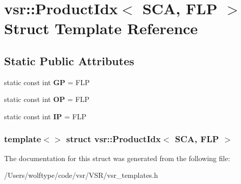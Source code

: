 \hypertarget{structvsr_1_1_product_idx_3_01_s_c_a_00_01_f_l_p_01_4}{\section{vsr\-:\-:Product\-Idx$<$ S\-C\-A, F\-L\-P $>$ Struct Template Reference}
\label{structvsr_1_1_product_idx_3_01_s_c_a_00_01_f_l_p_01_4}
}
\subsection*{Static Public Attributes}
\begin{DoxyCompactItemize}
\item 
\hypertarget{structvsr_1_1_product_idx_3_01_s_c_a_00_01_f_l_p_01_4_aa9c43460646c684ac5ad32e8f8d000f6}{static const int {\bfseries G\-P} = F\-L\-P}\label{structvsr_1_1_product_idx_3_01_s_c_a_00_01_f_l_p_01_4_aa9c43460646c684ac5ad32e8f8d000f6}

\item 
\hypertarget{structvsr_1_1_product_idx_3_01_s_c_a_00_01_f_l_p_01_4_a43f7615acd74e49afbeee18d6b19b89f}{static const int {\bfseries O\-P} = F\-L\-P}\label{structvsr_1_1_product_idx_3_01_s_c_a_00_01_f_l_p_01_4_a43f7615acd74e49afbeee18d6b19b89f}

\item 
\hypertarget{structvsr_1_1_product_idx_3_01_s_c_a_00_01_f_l_p_01_4_a0df1b884b42487070fb1b66b99a762ac}{static const int {\bfseries I\-P} = F\-L\-P}\label{structvsr_1_1_product_idx_3_01_s_c_a_00_01_f_l_p_01_4_a0df1b884b42487070fb1b66b99a762ac}

\end{DoxyCompactItemize}
\subsubsection*{template$<$$>$ struct vsr\-::\-Product\-Idx$<$ S\-C\-A, F\-L\-P $>$}



The documentation for this struct was generated from the following file\-:\begin{DoxyCompactItemize}
\item 
/\-Users/wolftype/code/vsr/\-V\-S\-R/vsr\-\_\-templates.\-h\end{DoxyCompactItemize}
